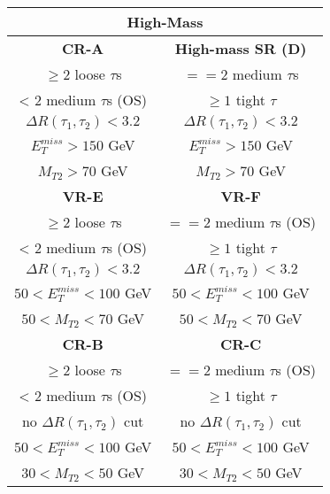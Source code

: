 %
\begin{tabular}{cc}
\hline
\multicolumn{2}{c}{\textbf{High-Mass}} \\ \hline \hline
\multicolumn{1}{c|}{\textbf{CR-A}} & \textbf{High-mass SR (D)} \\ \hline
\multicolumn{1}{c|}{$\geq2$ loose $\tau$s} & $==2$ medium $\tau$s \\
\multicolumn{1}{c|}{< 2 medium $\tau$s (OS)} & $\geq1$ tight $\tau$ \\
\multicolumn{1}{c|}{$\Delta R(\tau_1,\tau_2) <3.2$} & $\Delta R(\tau_1,\tau_2) <3.2$ \\
\multicolumn{1}{c|}{$E_T^{miss}>150$ GeV} & $E_T^{miss}>150$ GeV \\
\multicolumn{1}{c|}{$M_{T2} > 70$ GeV} & $M_{T2} > 70$ GeV \\ \hline \hline
\multicolumn{1}{c|}{\textbf{VR-E}} & \textbf{VR-F} \\ \hline
\multicolumn{1}{c|}{$\geq2$ loose $\tau$s} & $==2$ medium $\tau$s (OS) \\
\multicolumn{1}{c|}{< 2 medium $\tau$s (OS)} & $\geq1$ tight $\tau$ \\
\multicolumn{1}{c|}{$\Delta R(\tau_1,\tau_2) <3.2$} & $\Delta R(\tau_1,\tau_2) <3.2$ \\
\multicolumn{1}{c|}{$50<E_T^{miss}<100$ GeV} & $50<E_T^{miss}<100$ GeV \\
\multicolumn{1}{c|}{$50 < M_{T2} < 70$ GeV} & $50 < M_{T2} < 70$ GeV \\ \hline \hline
\multicolumn{1}{c|}{\textbf{CR-B}} & \textbf{CR-C} \\ \hline
\multicolumn{1}{c|}{$\geq2$ loose $\tau$s} & $==2$ medium $\tau$s (OS) \\
\multicolumn{1}{c|}{< 2 medium $\tau$s (OS)} & $\geq1$ tight $\tau$ \\
\multicolumn{1}{c|}{no $\Delta R(\tau_1,\tau_2)$ cut} & no $\Delta R(\tau_1,\tau_2)$ cut \\
\multicolumn{1}{c|}{$50<E_T^{miss}<100$ GeV} & $50<E_T^{miss}<100$ GeV \\
\multicolumn{1}{c|}{$30 < M_{T2} < 50$ GeV} & $30 < M_{T2} < 50$ GeV \\ \hline 
\end{tabular}


%
%
